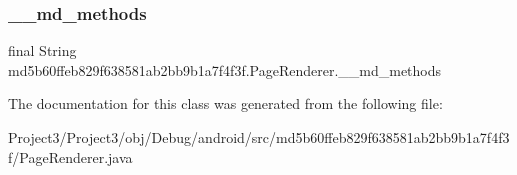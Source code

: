 \subsubsection{\texorpdfstring{\+\_\+\+\_\+md\+\_\+methods}{\_\_md\_methods}}
{\footnotesize\ttfamily final String md5b60ffeb829f638581ab2bb9b1a7f4f3f.\+Page\+Renderer.\+\_\+\+\_\+md\+\_\+methods\hspace{0.3cm}{\ttfamily [static]}}



The documentation for this class was generated from the following file\+:\begin{DoxyCompactItemize}
\item 
Project3/\+Project3/obj/\+Debug/android/src/md5b60ffeb829f638581ab2bb9b1a7f4f3f/Page\+Renderer.\+java\end{DoxyCompactItemize}
